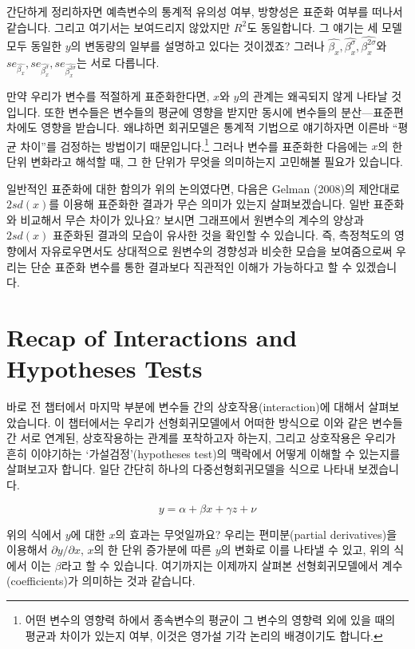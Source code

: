\documentclass[
]{book}
\begin{document}
간단하게 정리하자면 예측변수의 통계적 유의성 여부, 방향성은 표준화 여부를 떠나서 같습니다. 그리고 여기서는 보여드리지 않았지만 \(R^2\)도 동일합니다. 그 얘기는 세 모델 모두 동일한 \(y\)의 변동량의 일부를 설명하고 있다는 것이겠죠? 그러나 \(\hat{\beta_x}, \hat{\beta_x^{\sigma}}, \hat{\beta_x^{2\sigma}}\)와 \(se_{\hat{\beta_x}}, se_{\hat{\beta_x^{\sigma}}}, se_{\hat{\beta_x^{2\sigma}}}\)는 서로 다릅니다.

만약 우리가 변수를 적절하게 표준화한다면, \(x\)와 \(y\)의 관계는 왜곡되지 않게 나타날 것입니다. 또한 변수들은 변수들의 평균에 영향을 받지만 동시에 변수들의 분산---표준편차에도 영향을 받습니다. 왜냐하면 회귀모델은 통계적 기법으로 얘기하자면 이른바 ``평균 차이''를 검정하는 방법이기 때문입니다.\footnote{어떤 변수의 영향력 하에서 종속변수의 평균이 그 변수의 영향력 외에 있을 때의 평균과 차이가 있는지 여부, 이것은 영가설 기각 논리의 배경이기도 합니다.} 그러나 변수를 표준화한 다음에는 \(x\)의 한 단위 변화라고 해석할 때, 그 한 단위가 무엇을 의미하는지 고민해볼 필요가 있습니다.

일반적인 표준화에 대한 함의가 위의 논의였다면, 다음은 Gelman (2008)의 제안대로 \(2sd(x)\)를 이용해 표준화한 결과가 무슨 의미가 있는지 살펴보겠습니다. 일반 표준화와 비교해서 무슨 차이가 있나요? 보시면 그래프에서 원변수의 계수의 양상과 \(2sd(x)\) 표준화된 결과의 모습이 유사한 것을 확인할 수 있습니다. 즉, 측정척도의 영향에서 자유로우면서도 상대적으로 원변수의 경향성과 비슷한 모습을 보여줌으로써 우리는 단순 표준화 변수를 통한 결과보다 직관적인 이해가 가능하다고 할 수 있겠습니다.

\hypertarget{recap-of-interactions-and-hypotheses-tests}{%
\chapter{Recap of Interactions and Hypotheses Tests}\label{recap-of-interactions-and-hypotheses-tests}}

바로 전 챕터에서 마지막 부분에 변수들 간의 상호작용(interaction)에 대해서 살펴보았습니다. 이 챕터에서는 우리가 선형회귀모델에서 어떠한 방식으로 이와 같은 변수들 간 서로 연계된, 상호작용하는 관계를 포착하고자 하는지, 그리고 상호작용은 우리가 흔히 이야기하는 `가설검정'(hypotheses test)의 맥락에서 어떻게 이해할 수 있는지를 살펴보고자 합니다. 일단 간단히 하나의 다중선형회귀모델을 식으로 나타내 보겠습니다.

\[
y = \alpha +\beta x + \gamma z + \nu
\]

위의 식에서 \(y\)에 대한 \(x\)의 효과는 무엇일까요? 우리는 편미분(partial derivatives)을 이용해서 \(\partial y/\partial x\), \(x\)의 한 단위 증가분에 따른 \(y\)의 변화로 이를 나타낼 수 있고, 위의 식에서 이는 \(\beta\)라고 할 수 있습니다. 여기까지는 이제까지 살펴본 선형회귀모델에서 계수(coefficients)가 의미하는 것과 같습니다.
\end{document}
